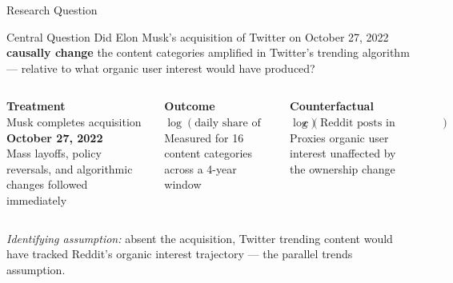 \documentclass[aspectratio=169]{beamer}
\begin{document}
\begin{frame}{Research Question}

\begin{block}{Central Question}
Did Elon Musk's acquisition of Twitter on October 27, 2022 \textbf{causally change} the content categories amplified in Twitter's trending algorithm --- relative to what organic user interest would have produced?
\end{block}

\vspace{0.8em}

\begin{columns}[t]
    \centering
    \textbf{Treatment}\\[0.3em]
    Musk completes acquisition\\
    \textbf{October 27, 2022}\\[0.3em]
    {\small Mass layoffs, policy reversals, and algorithmic changes followed immediately}

    \centering
    \textbf{Outcome}\\[0.3em]
    $\log(\text{daily share of trending topics in category } c)$\\[0.3em]
    {\small Measured for 16 content categories across a 4-year window}

    \centering
    \textbf{Counterfactual}\\[0.3em]
    $\log(\text{Reddit posts in matched subreddit})$\\[0.3em]
    {\small Proxies organic user interest unaffected by the ownership change}
\end{columns}

\vspace{0.5em}
\small \textit{Identifying assumption:} absent the acquisition, Twitter trending content would have tracked Reddit's organic interest trajectory --- the parallel trends assumption.
\end{frame}
\end{document}
